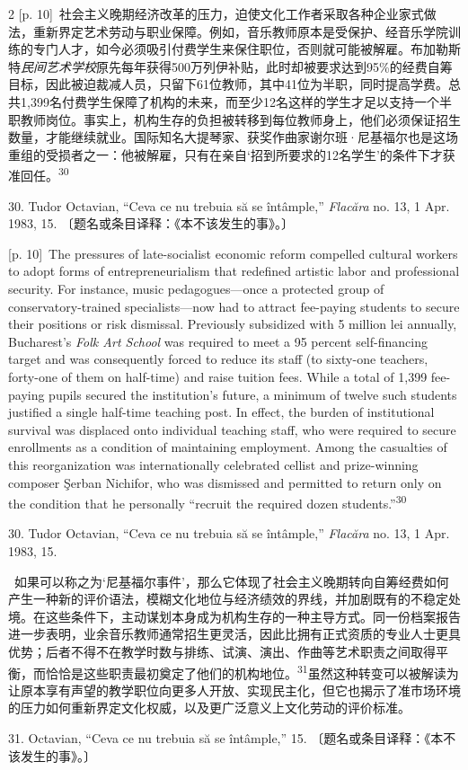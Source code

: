\documentclass[10pt,a4paper]{article}
\begin{document}
\begin{paracol}{2}
{\scriptsize\color{gray} [p. 10]}\ 社会主义晚期经济改革的压力，迫使文化工作者采取各种企业家式做法，重新界定艺术劳动与职业保障。例如，音乐教师原本是受保护、经音乐学院训练的专门人才，如今必须吸引付费学生来保住职位，否则就可能被解雇。布加勒斯特\textit{民间艺术学校}原先每年获得500万列伊补贴，此时却被要求达到95\%的经费自筹目标，因此被迫裁减人员，只留下61位教师，其中41位为半职，同时提高学费。总共1,399名付费学生保障了机构的未来，而至少12名这样的学生才足以支持一个半职教师岗位。事实上，机构生存的负担被转移到每位教师身上，他们必须保证招生数量，才能继续就业。国际知名大提琴家、获奖作曲家谢尔班·尼基福尔也是这场重组的受损者之一：他被解雇，只有在亲自‘招到所要求的12名学生’的条件下才获准回\mbox{任。\textsuperscript{30}}\par{\small 30. Tudor Octavian, “Ceva ce nu trebuia să se întâmple,” \textit{Flacăra} no. 13, 1 Apr. 1983, 15. 〔题名或条目译释：《本不该发生的事》。〕\par}
\switchcolumn
{\scriptsize\color{gray} [p. 10]}\ The pressures of late-socialist economic reform compelled cultural workers to adopt forms of entrepreneurialism that redefined artistic labor and professional security. For instance, music pedagogues—once a protected group of conservatory-trained specialists—now had to attract fee-paying students to secure their positions or risk dismissal. Previously subsidized with 5 million lei annually, Bucharest’s \textit{Folk Art School} was required to meet a 95 percent self-financing target and was consequently forced to reduce its staff (to sixty-one teachers, forty-one of them on half-time) and raise tuition fees. While a total of 1,399 fee-paying pupils secured the institution’s future, a minimum of twelve such students justified a single half-time teaching post. In effect, the burden of institutional survival was displaced onto individual teaching staff, who were required to secure enrollments as a condition of maintaining employment. Among the casualties of this reorganization was internationally celebrated cellist and prize-winning composer Şerban Nichifor, who was dismissed and permitted to return only on the condition that he personally “recruit the required dozen students.”\nobreak\textsuperscript{30}\par{\small 30. Tudor Octavian, “Ceva ce nu trebuia să se întâmple,” \textit{Flacăra} no. 13, 1 Apr. 1983, 15.\par}
\switchcolumn*
{\scriptsize\color{gray} [p. 11]}\ 如果可以称之为‘尼基福尔事件’，那么它体现了社会主义晚期转向自筹经费如何产生一种新的评价语法，模糊文化地位与经济绩效的界线，并加剧既有的不稳定处境。在这些条件下，主动谋划本身成为机构生存的一种主导方式。同一份档案报告进一步表明，业余音乐教师通常招生更灵活，因此比拥有正式资质的专业人士更具优势；后者不得不在教学时数与排练、试演、演出、作曲等艺术职责之间取得平衡，而恰恰是这些职责最初奠定了他们的机构地\mbox{位。\textsuperscript{31}}虽然这种转变可以被解读为让原本享有声望的教学职位向更多人开放、实现民主化，但它也揭示了准市场环境的压力如何重新界定文化权威，以及更广泛意义上文化劳动的评价标准。\par{\small 31. Octavian, “Ceva ce nu trebuia să se întâmple,” 15. 〔题名或条目译释：《本不该发生的事》。〕\par}

\end{paracol}
\end{document}
